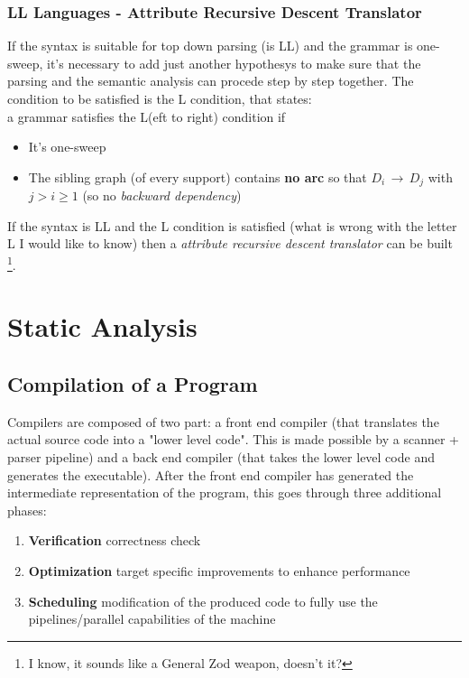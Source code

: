 \documentclass[10pt,a4paper]{article}
\begin{document}
			\subsubsection{LL Languages - Attribute Recursive Descent Translator}
				If the syntax is suitable for top down parsing (is LL) and the grammar is one-sweep, it's necessary to add just another hypothesys to make sure that the parsing and the semantic analysis can procede step by step together. The condition to be satisfied is the L condition, that states:\\
				a grammar satisfies the L(eft to right) condition if
				\begin{itemize}
					\item It's one-sweep
					\item The sibling graph (of every support) contains \textbf{no arc} so that $D_i \,\rightarrow\, D_j$ with $j > i \geq 1$ (so no \emph{backward dependency})
				\end{itemize}
				If the syntax is LL and the L condition is satisfied (what is wrong with the letter L I would like to know) then a \emph{attribute recursive descent translator} can be built \footnote{I know, it sounds like a General Zod weapon, doesn't it?}.\\
	
	\section{Static Analysis}
		\subsection{Compilation of a Program}
			Compilers are composed of two part: a front end compiler (that translates the actual source code into a "lower level code". This is made possible by a scanner + parser pipeline) and a back end compiler (that takes the lower level code and generates the executable). After the front end compiler has generated the intermediate representation of the program, this goes through three additional phases:
			\begin{enumerate}
				\item \textbf{Verification} correctness check
				\item \textbf{Optimization} target specific improvements to enhance performance
				\item \textbf{Scheduling} modification of the produced code to fully use the pipelines/parallel capabilities of the machine
			\end{enumerate}
			
\end{document}
